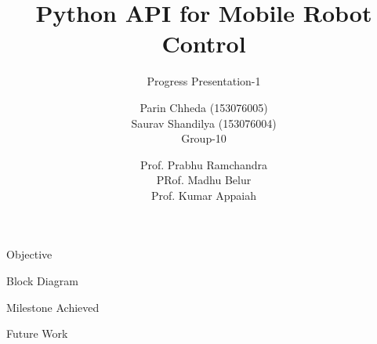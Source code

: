 \documentclass[10pt,handout,english]{beamer}
\title[] %
{Python API for Mobile Robot Control}
\subtitle{Progress Presentation-1}
\author[AE-663 Course Project ] %
{Parin Chheda (153076005) \\ Saurav Shandilya (153076004) \\ Group-10 }
\institute [Indian Institute of Technology Bombay]%
{
  
}
\date[\today] %
{Prof. Prabhu Ramchandra \\ PRof. Madhu Belur \\ Prof. Kumar Appaiah}
\begin{document}
\frame{\titlepage}

\begin{frame}{Objective}

\end{frame}

\begin{frame}{Block Diagram}

\end{frame}

\begin{frame}{Milestone Achieved}

\end{frame}

\begin{frame}{Future Work}

\end{frame}
\end{document}
